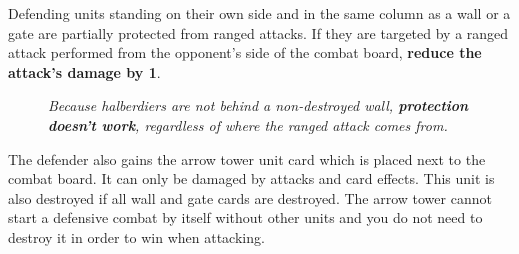 Defending units standing on their own side and in the same column as a wall or a gate are partially protected from ranged attacks.
If they are targeted by a ranged attack performed from the opponent's side of the combat board, \textbf{reduce the attack's damage by 1}.
\begin{figure}[h]
  \mbox{}%
  \hfill%
  \begin{minipage}[t]{0.4\textwidth}
    \centering
  \caption[halberdiers protected]{\textit{Halberdiers are behind a non-destroyed gate, they \textbf{are protected} when attacked from spaces 1-8.}}
  \end{minipage}
  \hfill%
  \begin{minipage}[t]{0.4\textwidth}
    \centering
  \caption[halberdiers unprotected]{\textit{Because halberdiers are not behind a non-destroyed wall, \textbf{protection doesn't work}, regardless of where the ranged attack comes from.}}
  \end{minipage}
  \hfill%
  \mbox{}%
\end{figure}

The defender also gains the arrow tower unit card which is placed next to the combat board.
It can only be damaged by  attacks and card effects.
This unit is also destroyed if all wall and gate cards are destroyed.
The arrow tower cannot start a defensive combat by itself without other units and you do not need to destroy it in order to win when attacking.

\clearpage

